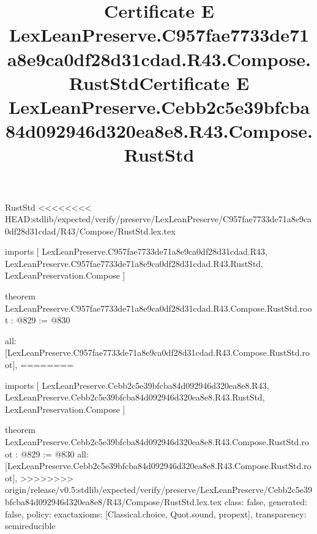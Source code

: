 \begin{lexlean}{RustStd}
<<<<<<<< HEAD:stdlib/expected/verify/preserve/LexLeanPreserve/C957fae7733de71a8e9ca0df28d31cdad/R43/Compose/RustStd.lex.tex
\title{Certificate E LexLeanPreserve.C957fae7733de71a8e9ca0df28d31cdad.R43.Compose.RustStd}
\begin{coremodule}
imports [
  LexLeanPreserve.C957fae7733de71a8e9ca0df28d31cdad.R43,
  LexLeanPreserve.C957fae7733de71a8e9ca0df28d31cdad.R43.RustStd,
  LexLeanPreservation.Compose
]

theorem LexLeanPreserve.C957fae7733de71a8e9ca0df28d31cdad.R43.Compose.RustStd.root : @829 := @830 {
  all: [LexLeanPreserve.C957fae7733de71a8e9ca0df28d31cdad.R43.Compose.RustStd.root],
========
\title{Certificate E LexLeanPreserve.Cebb2c5e39bfcba84d092946d320ea8e8.R43.Compose.RustStd}
\begin{coremodule}
imports [
  LexLeanPreserve.Cebb2c5e39bfcba84d092946d320ea8e8.R43,
  LexLeanPreserve.Cebb2c5e39bfcba84d092946d320ea8e8.R43.RustStd,
  LexLeanPreservation.Compose
]

theorem LexLeanPreserve.Cebb2c5e39bfcba84d092946d320ea8e8.R43.Compose.RustStd.root : @829 := @830 {
  all: [LexLeanPreserve.Cebb2c5e39bfcba84d092946d320ea8e8.R43.Compose.RustStd.root],
>>>>>>>> origin/release/v0.5:stdlib/expected/verify/preserve/LexLeanPreserve/Cebb2c5e39bfcba84d092946d320ea8e8/R43/Compose/RustStd.lex.tex
  class: false,
  generated: false,
  policy: exact{axioms: [Classical.choice, Quot.sound, propext]},
  transparency: semireducible
}


\end{coremodule}}
\end{coremodule}
\end{lexlean}
